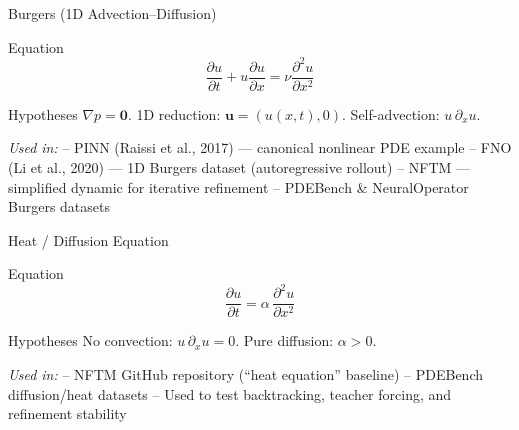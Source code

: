 \begin{secframe}
\small
\textcolor{red_unipd}{\Large Burgers (1D Advection–Diffusion)}

\vspace{0.6em}

\begin{alertblock}{Equation}
\[
\dfrac{\partial u}{\partial t} + u\dfrac{\partial u}{\partial x}
= \nu\dfrac{\partial^2 u}{\partial x^2}
\]
\end{alertblock}

\begin{block}{Hypotheses}
\(\nabla p=\mathbf{0}\). \quad
1D reduction: \(\mathbf{u}=(u(x,t),0)\). \quad
Self-advection: \(u\,\partial_x u\).
\end{block}

\vspace{0.5em}
\textit{Used in:}  
– PINN (Raissi et al., 2017) — canonical nonlinear PDE example  
– FNO (Li et al., 2020) — 1D Burgers dataset (autoregressive rollout)  
– NFTM — simplified dynamic for iterative refinement  
– PDEBench \& NeuralOperator Burgers datasets
\end{secframe}


\begin{secframe}
\small
\textcolor{red_unipd}{\Large Heat / Diffusion Equation}

\vspace{0.6em}

\begin{alertblock}{Equation}
\[
\dfrac{\partial u}{\partial t} =
\alpha\,\dfrac{\partial^2 u}{\partial x^2}
\]
\end{alertblock}

\begin{block}{Hypotheses}
No convection: \(u\,\partial_x u = 0\). \quad
Pure diffusion: \(\alpha>0\).
\end{block}

\vspace{0.5em}
\textit{Used in:}  
– NFTM GitHub repository (“heat equation” baseline)  
– PDEBench diffusion/heat datasets  
– Used to test backtracking, teacher forcing, and refinement stability
\end{secframe}



